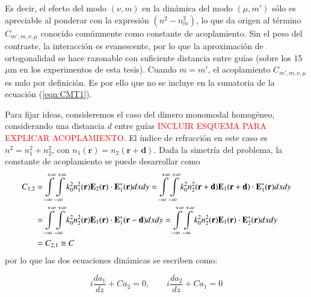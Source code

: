 Es decir, el efecto del modo $(\nu, m)$ en la dinámica del modo $(\mu, m')$ sólo es apreciable al ponderar con la expresión $(n^2 - n^2_{m})$, lo que da origen al término $C_{m', m, \nu, \mu}$ conocido comúnmente como constante de acoplamiento. Sin el peso del contraste, la interacción es evanescente, por lo que la aproximación de ortogonalidad se hace razonable con suficiente distancia entre guías (sobre los 15 $\mu$m en los experimentos de esta tesis). Cuando $m=m'$, el acoplamiento $C_{m', m, \nu, \mu}$ es nulo por definición. Es por ello que no se incluye en la sumatoria de la ecuación (\ref{eqn:CMT1}). 

Para fijar ideas, consideremos el caso del dímero monomodal homogéneo, considerando una distancia $d$ entre guías \textcolor{red}{INCLUIR ESQUEMA PARA EXPLICAR ACOPLAMIENTO}. El índice de refracción en este caso es $n^2 = n_1^2 + n_2^2$, con $n_1(\textbf{r})=n_2(\textbf{r}+\textbf{d})$. Dada la simetría del problema, la constante de acoplamiento se puede desarrollar como 
\begin{align}
	C_{1, 2} &=  \int\displaylimits_{-\infty}^{+\infty}\int\displaylimits_{-\infty}^{+\infty} k_0^2 n_1^2(\textbf{r}) \textbf{E}_{2}(\textbf{r}) \cdot \textbf{E}_{1}^*(\textbf{r}) dxdy 
	= \int\displaylimits_{-\infty}^{+\infty}\int\displaylimits_{-\infty}^{+\infty} k_0^2 n_2^2(\textbf{r}+\textbf{d}) \textbf{E}_{1}(\textbf{r}+\textbf{d}) \cdot \textbf{E}_{1}^*(\textbf{r}) dxdy 
	\nonumber	
	\\	
	&= \int\displaylimits_{-\infty}^{+\infty}\int\displaylimits_{-\infty}^{+\infty} k_0^2 n_2^2(\textbf{r}) \textbf{E}_{1}(\textbf{r}) \cdot \textbf{E}_{1}^*(\textbf{r}-\textbf{d}) dxdy 
	= \int\displaylimits_{-\infty}^{+\infty}\int\displaylimits_{-\infty}^{+\infty} k_0^2 n_2^2(\textbf{r}) \textbf{E}_{1}(\textbf{r}) \cdot \textbf{E}_{2}^*(\textbf{r}) dxdy 
	\nonumber
	\\	
	&= C_{2,1} \equiv C
	\nonumber
\end{align}
 por lo que las dos ecuaciones dinámicas se escriben como:

\begin{equation}
	i\frac{d a_1}{dz} + C a_2 = 0, \quad\quad i\frac{d a_2}{dz} + C a_1 = 0 \nonumber
\end{equation}


	
